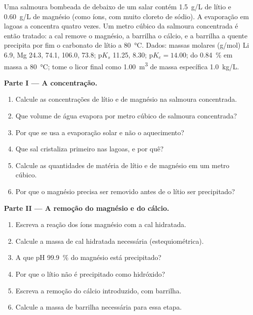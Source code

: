 \begin{problem}
\label{pb:b1:s-block:1}
Uma salmoura bombeada de debaixo de um salar contém \qty{1.5}{g/L} de
lítio e \qty{0.60}{g/L} de magnésio (como íons, com muito cloreto de
sódio). A evaporação em lagoas a concentra quatro vezes. Um metro cúbico
da salmoura concentrada é então tratado: a cal remove o magnésio, a
barrilha o cálcio, e a barrilha a quente precipita por fim o carbonato de
lítio a \qty{80}{\celsius}. Dados: massas molares (\unit{g/mol}) Li 6.9, Mg 24.3,
 74.1,  106.0,  73.8; $\mathrm{p}K_s$
 11.25,  8.30; $\mathrm{p}K_e = 14.00$; 
do  \qty{0.84}{\percent} em massa a \qty{80}{\celsius}; tome
o licor final como \qty{1.00}{m^3} de massa específica \qty{1.0}{kg/L}.

\medskip
\noindent\textbf{Parte I --- A concentração.}
\begin{enumerate}
  \item Calcule as concentrações de lítio e de magnésio na salmoura
        concentrada.
  \item Que volume de água evapora por metro cúbico de salmoura
        concentrada?
  \item Por que se usa a evaporação solar e não o aquecimento?
  \item Que sal cristaliza primeiro nas lagoas, e por quê?
  \item Calcule as quantidades de matéria de lítio e de magnésio em um metro cúbico.
  \item Por que o magnésio precisa ser removido antes de o lítio ser precipitado?
\end{enumerate}

\medskip
\noindent\textbf{Parte II --- A remoção do magnésio e do cálcio.}
\begin{enumerate}[resume]
  \item Escreva a reação dos íons magnésio com a cal hidratada.
  \item Calcule a massa de cal hidratada necessária (estequiométrica).
  \item A que pH \qty{99.9}{\percent} do magnésio está precipitado?
  \item Por que o lítio não é precipitado como hidróxido?
  \item Escreva a remoção do cálcio introduzido, com barrilha.
  \item Calcule a massa de barrilha necessária para essa etapa.
\end{enumerate}


\end{problem}
